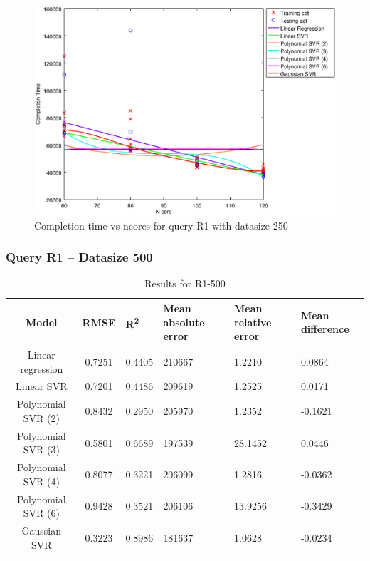 \documentclass[a4paper,11pt]{article}
\begin{document}
\begin {figure}[hbtp]
\centering
\includegraphics[width=\textwidth]{output/R1_250_ONLY_1_LINEAR_NCORE/plot_R1_250.eps}
\caption{Completion time vs ncores for query R1 with datasize 250}
\label{fig:coreonly_linear_R1_250}
\end {figure}

\newpage
\subsubsection{Query R1 -- Datasize 500}
\begin{table}[H]
	\centering
	\begin{adjustbox}{center}
		\begin{tabular}{c | c M{1.2cm} M{2.5cm} M{2.5cm} M{1.8cm}}
			Model & RMSE & R\textsuperscript{2} & Mean absolute error & Mean relative error & Mean difference \tabularnewline
			\hline
			Linear regression & 0.7251 & 0.4405 & 210667 & 1.2210 & 0.0864 \\
			Linear SVR & 0.7201 & 0.4486 & 209619 & 1.2525 & 0.0171 \\
			Polynomial SVR (2) & 0.8432 & 0.2950 & 205970 & 1.2352 & -0.1621 \\
			Polynomial SVR (3) & 0.5801 & 0.6689 & 197539 & 28.1452 & 0.0446 \\
			Polynomial SVR (4) & 0.8077 & 0.3221 & 206099 & 1.2816 & -0.0362 \\
			Polynomial SVR (6) & 0.9428 & 0.3521 & 206106 & 13.9256 & -0.3429 \\
			Gaussian SVR & 0.3223 & 0.8986 & 181637 & 1.0628 & -0.0234 \\
		\end{tabular}
	\end{adjustbox}
	\\
	\caption{Results for R1-500}
	\label{fig:coreonly_linear_R1_500}
\end{table}
\end{document}
